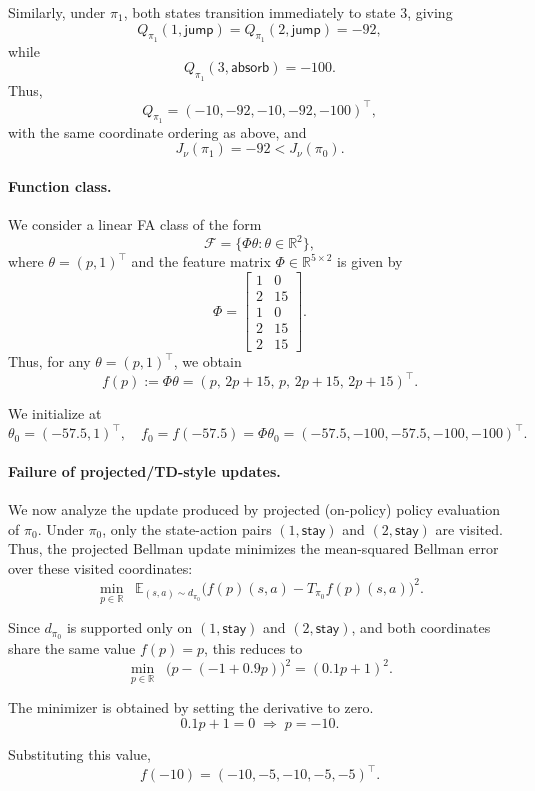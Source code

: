 \documentclass[twoside]{article}
\theoremstyle{plain}
\theoremstyle{definition}
\theoremstyle{remark}
\begin{document}
Similarly, under $\pi_1$, both states transition immediately to state $3$, giving
\[
Q_{\pi_1}(1,\textsf{jump}) = Q_{\pi_1}(2,\textsf{jump}) = -92,
\]
while
\[
Q_{\pi_1}(3,\textsf{absorb}) = -100.
\]
Thus,
\[
Q_{\pi_1}
=
(-10,-92,-10,-92,-100)^\top,
\]
with the same coordinate ordering as above, and
\[
J_\nu(\pi_1) = -92 < J_\nu(\pi_0).
\]

\paragraph{Function class.}
We consider a linear FA class of the form
\[
\mathcal F = \{\Phi \theta : \theta \in \mathbb{R}^2\},
\]
where $\theta = (p, 1)^\top$ and the feature matrix $\Phi \in \mathbb{R}^{5 \times 2}$ is given by
\[
\Phi =
\begin{bmatrix}
1 & 0 \\
2 & 15 \\
1 & 0 \\
2 & 15 \\
2 & 15
\end{bmatrix}.
\]
Thus, for any $\theta = (p,1)^\top$, we obtain
\[
f(p) := \Phi \theta = (p,\,2p+15,\,p,\,2p+15,\,2p+15)^\top.
\]

We initialize at
\[
\theta_0 = (-57.5, 1)^\top,
\quad
f_0 = f(-57.5) = \Phi \theta_0 = (-57.5,-100,-57.5,-100,-100)^\top.
\]


\paragraph{Failure of projected/TD-style updates.}
We now analyze the update produced by projected (on-policy) policy evaluation of $\pi_0$. Under $\pi_0$, only the state-action pairs $(1,\textsf{stay})$ and $(2,\textsf{stay})$ are visited. 
Thus, the projected Bellman update minimizes the mean-squared Bellman error over these visited coordinates:
\[
\min_{p \in \mathbb{R}}
\;\;
\mathbb{E}_{(s,a)\sim d_{\pi_0}}
\bigl( f(p)(s,a) - T_{\pi_0} f(p)(s,a) \bigr)^2.
\]

Since $d_{\pi_0}$ is supported only on $(1,\textsf{stay})$ and $(2,\textsf{stay})$, and both coordinates share the same value $f(p)=p$, this reduces to
\[
\min_{p \in \mathbb{R}}
\;\;
\bigl( p - (-1 + 0.9 p) \bigr)^2 = (0.1 p + 1)^2.
\]

The minimizer is obtained by setting the derivative to zero.
\[
0.1 p + 1 = 0 \;\Rightarrow\; p = -10.
\]

Substituting this value,
\[
f(-10) = (-10,-5,-10,-5,-5)^\top.
\]
\end{document}
